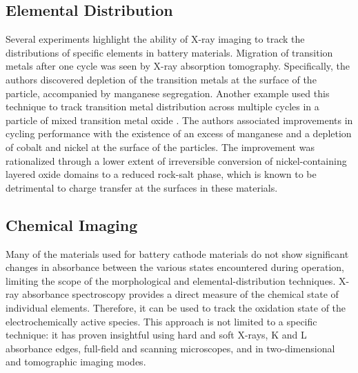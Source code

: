 \documentclass[journal=cmatex,manuscript=perspective]{achemso}
\begin{document}
\subsection{Elemental Distribution}
Several experiments highlight the ability of X-ray imaging to track
the distributions of specific elements in battery materials. Migration
of transition metals after one cycle was seen by X-ray absorption
tomography\cite{yang2014-2}. Specifically, the authors discovered
depletion of the transition metals at the surface of the particle,
accompanied by manganese segregation. Another example used this
technique to track transition metal distribution across multiple
cycles in a particle of mixed transition metal oxide
\cite{lin2016}. The authors
associated improvements in cycling performance with the existence of
an excess of manganese and a depletion of cobalt and nickel at the
surface of the particles. The improvement was rationalized through a
lower extent of irreversible conversion of nickel-containing layered
oxide domains to a reduced rock-salt phase, which is known to be
detrimental to charge transfer at the surfaces in these
materials\cite{xu2016-2}.


\subsection{Chemical Imaging}

Many of the materials used for battery cathode materials do not show
significant changes in absorbance between the various states
encountered during operation, limiting the scope of the morphological
and elemental-distribution techniques. X-ray absorbance spectroscopy
provides a direct measure of the chemical state of individual
elements. Therefore, it can be used to track the oxidation state of
the electrochemically active species. This approach is not limited to
a specific technique: it has proven insightful using hard and soft
X-rays, K and L absorbance edges, full-field and scanning microscopes,
and in two-dimensional and tomographic imaging modes.
\end{document}
